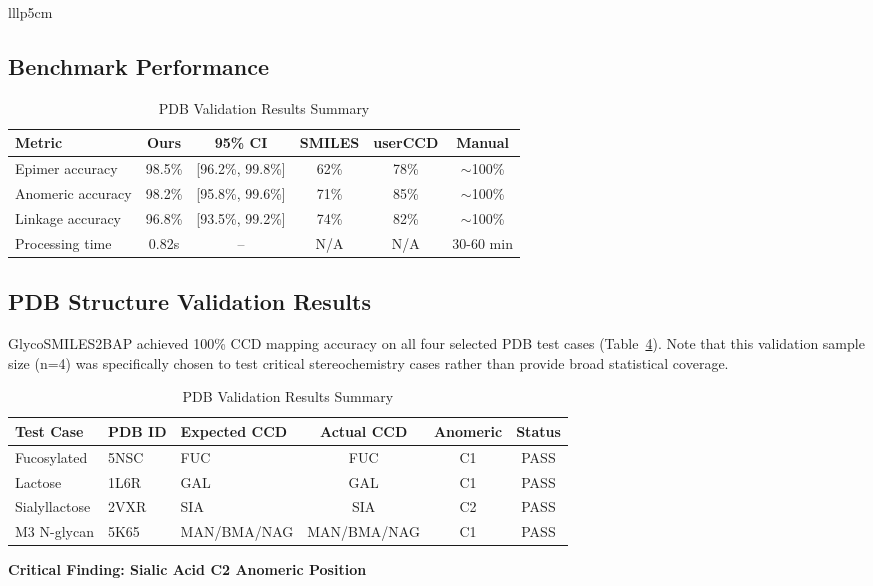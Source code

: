 \documentclass[11pt,a4paper]{article}
\begin{document}
{\begin{table}[h]
\begin{tabular}{lllp{5cm}}
\subsection{Benchmark Performance}

\begin{table}[h]
\centering
\caption{Benchmark Performance Comparison}
\begin{tabular}{lccccc}
\toprule
Metric & Ours & 95\% CI & SMILES & userCCD & Manual \\
\midrule
Epimer accuracy & 98.5\% & [96.2\%, 99.8\%] & 62\% & 78\% & $\sim$100\% \\
Anomeric accuracy & 98.2\% & [95.8\%, 99.6\%] & 71\% & 85\% & $\sim$100\% \\
Linkage accuracy & 96.8\% & [93.5\%, 99.2\%] & 74\% & 82\% & $\sim$100\% \\
Processing time & 0.82s & -- & N/A & N/A & 30-60 min \\
\bottomrule
\end{tabular}
\label{tab:benchmark_results}
\end{table}

\subsection{PDB Structure Validation Results}

GlycoSMILES2BAP achieved 100\% CCD mapping accuracy on all four selected PDB test cases (Table~\ref{tab:pdb_results}). Note that this validation sample size (n=4) was specifically chosen to test critical stereochemistry cases rather than provide broad statistical coverage.

\begin{table}[h]
\centering
\caption{PDB Validation Results Summary}
\begin{tabular}{lllccc}
\toprule
Test Case & PDB ID & Expected CCD & Actual CCD & Anomeric & Status \\
\midrule
Fucosylated & 5NSC & FUC & FUC & C1 & PASS \\
Lactose & 1L6R & GAL & GAL & C1 & PASS \\
Sialyllactose & 2VXR & SIA & SIA & C2 & PASS \\
M3 N-glycan & 5K65 & MAN/BMA/NAG & MAN/BMA/NAG & C1 & PASS \\
\bottomrule
\end{tabular}
\label{tab:pdb_results}
\end{table}

\textbf{Critical Finding: Sialic Acid C2 Anomeric Position}


\end{tabular}
\end{table}}
\end{document}
